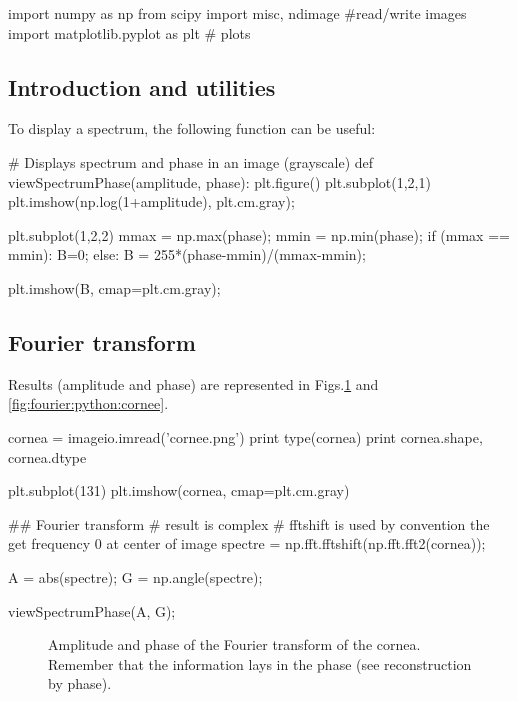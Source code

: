 \def\QRCODE{TB_image_TUT.IMG.cornea_fourier_pythonqrcode.png}
\def\QRPAGE{http://www.iptutorials.science/tree/master/TB_image/TUT.IMG.cornea_fourier/python}

\begin{python}
import numpy as np
from scipy import misc, ndimage #read/write images
import matplotlib.pyplot as plt # plots
\end{python}

\subsection{Introduction and utilities} To display a spectrum, the following function can be useful:
\begin{python}
# Displays spectrum and phase in an image (grayscale)
def viewSpectrumPhase(amplitude, phase):
    plt.figure()
    plt.subplot(1,2,1)
    plt.imshow(np.log(1+amplitude), plt.cm.gray);
    
    plt.subplot(1,2,2)
    mmax = np.max(phase);
    mmin = np.min(phase);
    if (mmax == mmin):
        B=0;
    else:
        B = 255*(phase-mmin)/(mmax-mmin);
        
    plt.imshow(B, cmap=plt.cm.gray);

\end{python}

\subsection{Fourier transform}
Results (amplitude and phase) are represented in Figs.\ref{fig:fourier:python:fft} and \ref{fig:fourier:python:cornee}.

\begin{python}
cornea = imageio.imread('cornee.png')
print type(cornea)
print cornea.shape, cornea.dtype

plt.subplot(131)
plt.imshow(cornea, cmap=plt.cm.gray)
\end{python}

\begin{python}
## Fourier transform
#  result is complex
#  fftshift is used by convention the get frequency 0 at center of image
spectre = np.fft.fftshift(np.fft.fft2(cornea));

A = abs(spectre);
G = np.angle(spectre);

viewSpectrumPhase(A, G);
\end{python}

\begin{figure}[htbp]
 \centering
 \hfill
 \caption{Amplitude and phase of the Fourier transform of the cornea. Remember that the information lays in the phase (see reconstruction by phase).}\label{fig:fourier:python:fft}
\end{figure}

